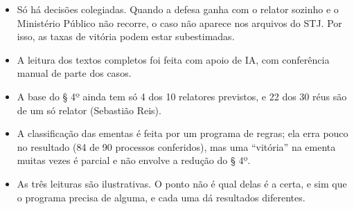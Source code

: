 \begin{itemize}
  \item Só há decisões colegiadas. Quando a defesa ganha com o relator sozinho e o Ministério
        Público não recorre, o caso não aparece nos arquivos do STJ. Por isso, as taxas de
        vitória podem estar subestimadas.
  \item A leitura dos textos completos foi feita com apoio de IA, com conferência manual
        de parte dos casos. 
  \item A base do § 4º ainda tem só 4 dos 10 relatores previstos, e 22 dos 30 réus são de um
        só relator (Sebastião Reis). 
  \item A classificação das ementas é feita por um programa de regras; ela erra pouco no
        resultado (84 de 90 processos conferidos), mas uma ``vitória'' na ementa muitas vezes é
        parcial e não envolve a redução do § 4º.
  \item As três leituras são ilustrativas. O ponto não é qual delas é a certa, e sim que o
        programa precisa de alguma, e cada uma dá resultados diferentes.
\end{itemize}